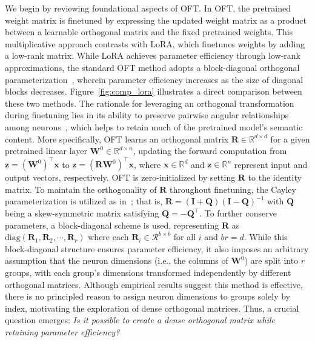 We begin by reviewing foundational aspects of OFT. In OFT, the pretrained weight matrix is finetuned by expressing the updated weight matrix as a product between a learnable orthogonal matrix and the fixed pretrained weights. This multiplicative approach contrasts with LoRA, which finetunes weights by adding a low-rank matrix. While LoRA achieves parameter efficiency through low-rank approximations, the standard OFT method adopts a block-diagonal orthogonal parameterization~\cite{qiu2023controlling}, wherein parameter efficiency increases as the size of diagonal blocks decreases. Figure~\ref{fig:comp_lora} illustrates a direct comparison between these two methods. The rationale for leveraging an orthogonal transformation during finetuning lies in its ability to preserve pairwise angular relationships among neurons~\cite{liu2018learning,liu2021orthogonal,qiu2023controlling}, which helps to retain much of the pretrained model's semantic content. More specifically, OFT learns an orthogonal matrix $\bm{R}\in\mathbb{R}^{d\times d}$ for a given pretrained linear layer $\bm{W}^0\in\mathbb{R}^{d\times n}$, updating the forward computation from $\bm{z}=(\bm{W}^0)^\top\bm{x}$ to $\bm{z}=(\bm{R}\bm{W}^0)^\top\bm{x}$, where $\bm{x}\in\mathbb{R}^{d}$ and $\bm{z}\in\mathbb{R}^{n}$ represent input and output vectors, respectively. OFT is zero-initialized by setting $\bm{R}$ to the identity matrix. To maintain the orthogonality of $\bm{R}$ throughout finetuning, the Cayley parameterization is utilized as in~\cite{qiu2023controlling,liu2021orthogonal}; that is, $\bm{R}=(\bm{I}+\bm{Q})(\bm{I}-\bm{Q})^{-1}$ with $\bm{Q}$ being a skew-symmetric matrix satisfying $\bm{Q}=-\bm{Q}^\top$. To further conserve parameters, a block-diagonal scheme is used, representing $\bm{R}$ as $\text{diag}(\bm{R}_1,\bm{R}_2,\cdots,\bm{R}_r)$ where each $\bm{R}_i\in\mathcal{R}^{b\times b}$ for all $i$ and $br=d$. While this block-diagonal structure ensures parameter efficiency, it also imposes an arbitrary assumption that the neuron dimensions (i.e., the columns of $\bm{W}^0$) are split into $r$ groups, with each group’s dimensions transformed independently by different orthogonal matrices. Although empirical results suggest this method is effective, there is no principled reason to assign neuron dimensions to groups solely by index, motivating the exploration of dense orthogonal matrices. Thus, a crucial question emerges: \emph{Is it possible to create a dense orthogonal matrix while retaining parameter efficiency?}

